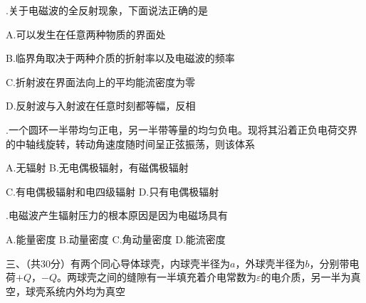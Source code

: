 .\hspace{0.8em}关于电磁波的全反射现象，下面说法正确的是\vspace{0.2cm}

A.\hspace{0.8em}可以发生在任意两种物质的界面处

B.\hspace{0.8em}临界角取决于两种介质的折射率以及电磁波的频率

C.\hspace{0.8em}折射波在界面法向上的平均能流密度为零

D.\hspace{0.8em}反射波与入射波在任意时刻都等幅，反相\vspace{0.2cm}

.\hspace{0.8em}一个圆环一半带均匀正电，另一半带等量的均匀负电。现将其沿着正负电荷交界的中轴线旋转，转动角速度随时间呈正弦振荡，则该体系\vspace{0.2cm}

A.\hspace{0.8em}无辐射 \hspace{16em} 
B.\hspace{0.8em}无电偶极辐射，有磁偶极辐射

C.\hspace{0.8em}有电偶极辐射和电四级辐射 \hspace{7em} 
D.\hspace{0.8em}只有电偶极辐射\vspace{0.2cm}

.\hspace{0.8em}电磁波产生辐射压力的根本原因是因为电磁场具有\vspace{0.2cm}

A.\hspace{0.8em}能量密度 \hspace{1em} B.\hspace{0.8em}动量密度 \hspace{1em} C.\hspace{0.8em}角动量密度 \hspace{1em}  D.\hspace{0.8em}能流密度

\newpage
\noindent
三、\hspace{0.2em}（共30分）有两个同心导体球壳，内球壳半径为$a$，外球壳半径为$b$，分别带电荷$+Q$，$-Q$。两球壳之间的缝隙有一半填充着介电常数为$\varepsilon$的电介质，另一半为真空，球壳系统内外均为真空\vspace{0.2cm}

